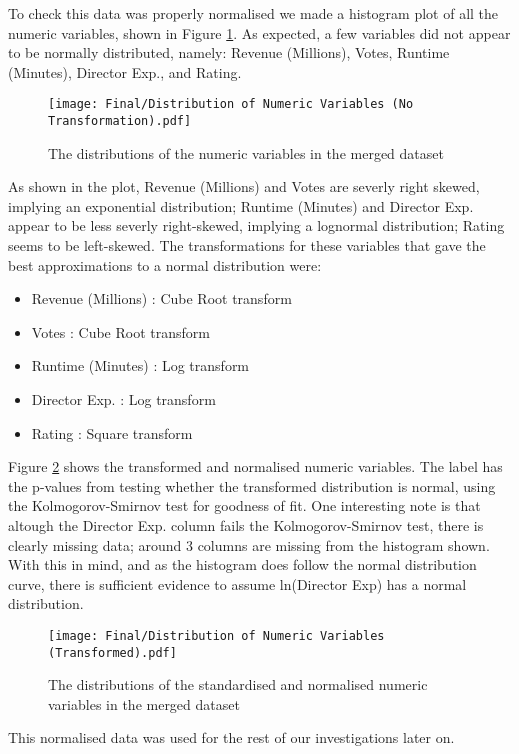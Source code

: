         To check this data was properly normalised we made a histogram plot of all the
            numeric variables, shown in Figure \ref*{fig-distribution-of-numeric-variable}.
        As expected, a few variables did not appear to be normally distributed, namely:
        Revenue (Millions), Votes, Runtime (Minutes), Director Exp., and Rating.
        \begin{figure}[H]
            \centering
            \texttt{[image: Final/Distribution of Numeric Variables (No Transformation).pdf]}
            \caption[short]{The distributions of the numeric variables in the merged dataset}\label{fig-distribution-of-numeric-variable}
        \end{figure}
        As shown in the plot, Revenue (Millions) and Votes are severly right skewed,
            implying an exponential distribution; Runtime (Minutes) and Director Exp.
        appear to be less severly right-skewed, implying a lognormal distribution;
        Rating seems to be left-skewed.
        The transformations for these variables that gave the best approximations to a
            normal distribution were:
        \begin{multicols}{2}
            \begin{itemize}
                \item Revenue (Millions) : Cube Root transform
                \item Votes              : Cube Root transform
                \item Runtime (Minutes)  : Log transform
                \item Director Exp.      : Log transform
                \item Rating             : Square transform
            \end{itemize}
        \end{multicols}
        Figure \ref*{fig-transformed-distribution-of-numeric-variable} shows the
            transformed and normalised numeric variables.
        The label has the p-values from testing whether the transformed distribution is
            normal, using the Kolmogorov-Smirnov test\cite*{KStest} for goodness of fit.
        One interesting note is that altough the Director Exp.
        column fails the Kolmogorov-Smirnov test, there is clearly missing
        data; around 3 columns are missing from the histogram shown.
        With this in mind, and as the histogram does follow the normal distribution
            curve, there is sufficient evidence to assume ln(Director Exp) has a normal
            distribution.
        \begin{figure}[H]
            \centering
            \texttt{[image: Final/Distribution of Numeric Variables (Transformed).pdf]}
            \caption[short]{The distributions of the standardised and normalised numeric variables in the merged dataset}\label{fig-transformed-distribution-of-numeric-variable}
        \end{figure}
        This normalised data was used for the rest of our investigations later on.
